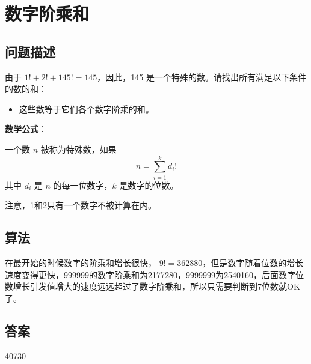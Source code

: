 \section{数字阶乘和}
\subsection{问题描述}
\begin{tcolorbox}

	由于 $1! + 2! + 145! = 145$，因此，145 是一个特殊的数。请找出所有满足以下条件的数的和：
	\begin{itemize}
		\item 这些数等于它们各个数字阶乘的和。
	\end{itemize}

	\textbf{数学公式}：

	一个数 $n$ 被称为特殊数，如果
	\[
		n = \sum_{i=1}^{k} d_i!
	\]
	其中 $d_i$ 是 $n$ 的每一位数字，$k$ 是数字的位数。

    注意，1和2只有一个数字不被计算在内。
\end{tcolorbox}

\subsection{算法}
在最开始的时候数字的阶乘和增长很快， \( 9! = 362880
\)，但是数字随着位数的增长速度变得更快，\num{999999}的数字阶乘和为\num{2177280}，\num{9999999}为\num{2540160}，后面数字位数增长引发值增大的速度远远超过了数字阶乘和，所以只需要判断到7位数就OK了。

\subsection{答案}
40730
